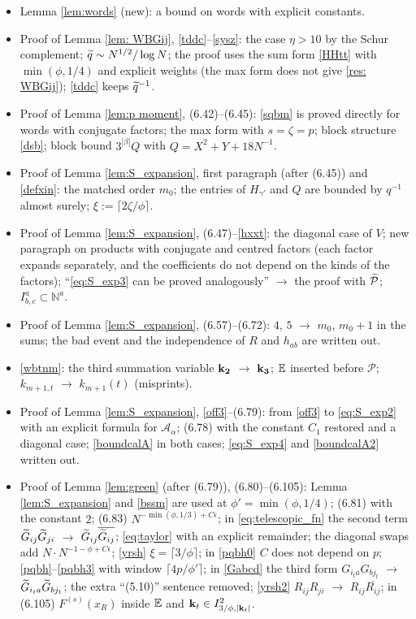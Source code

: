 \begin{itemize}
\item Lemma \ref{lem:words} (new): a bound on words with explicit constants.
\item Proof of Lemma \ref{lem: WBGij}, \eqref{tddc}--\eqref{sysz}: the case $\eta>10$ by the Schur complement; $\widetilde q\sim N^{1/2}/\log N$; the proof uses the sum form \eqref{HHtt} with $\min(\phi,1/4)$ and explicit weights (the max form does not give \eqref{res: WBGij}); \eqref{tddc} keeps $\widetilde q^{-1}$.
\item Proof of Lemma \ref{lem:p moment}, (6.42)--(6.45): \eqref{sqbm} is proved directly for words with conjugate factors; the max form with $s=\zeta=p$; block structure \eqref{dsb}; block bound $3^{|\beta|}Q$ with $Q=X^2+Y+18N^{-1}$.
\item Proof of Lemma \ref{lem:S_expansion}, first paragraph (after (6.45)) and \eqref{defxin}: the matched order $m_0$; the entries of $H_{\gamma'}$ and $Q$ are bounded by $q^{-1}$ almost surely; $\xi:=\lceil2\zeta/\phi\rceil$.
\item Proof of Lemma \ref{lem:S_expansion}, (6.47)--\eqref{hxxt}: the diagonal case of $V$; new paragraph on products with conjugate and centred factors (each factor expands separately, and the coefficients do not depend on the kinds of the factors); ``\eqref{eq:S_exp3} can be proved analogously'' $\to$ the proof with $\widetilde{\mathcal P}$; $I^a_{b,c}\subset\mathbb N^a$.
\item Proof of Lemma \ref{lem:S_expansion}, (6.57)--(6.72): $4$, $5$ $\to$ $m_0$, $m_0+1$ in the sums; the bad event and the independence of $R$ and $h_{ab}$ are written out.
\item \eqref{wbtnm}: the third summation variable ${\bf k_2}$ $\to$ ${\bf k_3}$; $\mathbb{E}$ inserted before $\mathcal P$; $k_{m+1,t}$ $\to$ $k_{m+1}(t)$ (misprints).
\item Proof of Lemma \ref{lem:S_expansion}, \eqref{off3}--(6.79): from \eqref{off3} to \eqref{eq:S_exp2} with an explicit formula for $\mathcal A_\alpha$; (6.78) with the constant $C_1$ restored and a diagonal case; \eqref{boundcalA} in both cases; \eqref{eq:S_exp4} and \eqref{boundcalA2} written out.
\item Proof of Lemma \ref{lem:green} (after (6.79)), (6.80)--(6.105): Lemma \ref{lem:S_expansion} and \eqref{bssm} are used at $\phi'=\min(\phi,1/4)$; (6.81) with the constant $2$; (6.83) $N^{-\min(\phi,1/3)+C\epsilon}$; in \eqref{eq:telescopic_fn} the second term $\widetilde G_{ij}\widetilde G_{ji}$ $\to$ $\widetilde G_{ij}\overline{\widetilde G_{ij}}$; \eqref{eq:taylor} with an explicit remainder; the diagonal swaps add $N\cdot N^{-1-\phi+C\epsilon}$; \eqref{yrsh} $\xi=\lceil3/\phi\rceil$; in \eqref{pqbh0} $C$ does not depend on $p$; \eqref{pqbh}--\eqref{pqbh3} with window $\lceil4p/\phi'\rceil$; in \eqref{Gabcd} the third form $G_{i_ta}G_{bj_t}$ $\to$ $\widetilde G_{i_ta}\widetilde G_{bj_t}$; the extra ``(5.10)'' sentence removed; \eqref{yrsh2} $R_{ij}R_{ji}$ $\to$ $R_{ij}\overline{R_{ij}}$; in (6.105) $F^{(s)}(x_R)$ inside $\mathbb{E}$ and ${\bf k}_t\in I^2_{3/\phi,|{\bf k}_t|}$.
\end{itemize}

